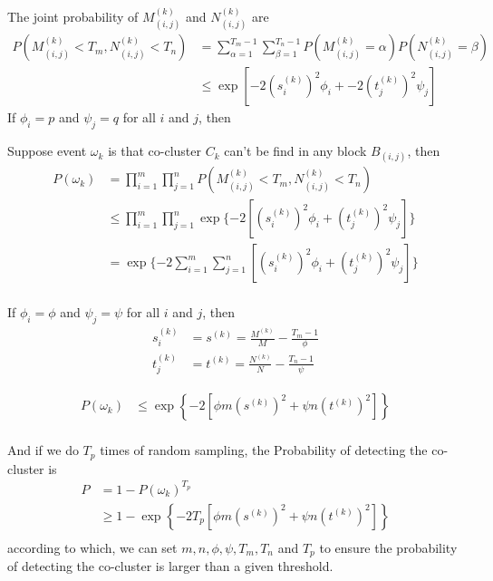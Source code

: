 The joint probability of $M_{(i,j)}^{(k)}$ and $N_{(i,j)}^{(k)}$ are
\begin{align*}
    P(M_{(i,j)}^{(k)} < T_m, N_{(i,j)}^{(k)} < T_n) & = \sum_{\alpha=1}^{T_m-1} \sum_{\beta=1}^{T_n-1} P(M_{(i,j)}^{(k)} = \alpha) P(N_{(i,j)}^{(k)} = \beta) \\
                                                    & \le \exp[-2 (s_i^{(k)})^2 \phi_i + -2 (t_j^{(k)})^2 \psi_j]
\end{align*}
If $\phi_i = p$ and $\psi_j = q$ for all $i$ and $j$, then

Suppose event $\omega_k$ is that co-cluster $C_k$ can't be find in any block $B_{(i,j)}$, then
\begin{align*}
    P(\omega_k) & = \prod_{i=1}^m \prod_{j=1}^n P(M_{(i,j)}^{(k)} < T_m, N_{(i,j)}^{(k)} < T_n)                          \\
                & \le \prod_{i=1}^m \prod_{j=1}^n \exp\{-2 \left[ (s_i^{(k)})^2 \phi_i + (t_j^{(k)})^2 \psi_j \right] \} \\
                & = \exp\{-2 \sum_{i=1}^m \sum_{j=1}^n \left[ (s_i^{(k)})^2 \phi_i + (t_j^{(k)})^2 \psi_j \right] \}     \\
\end{align*}

If $\phi_i = \phi$ and $\psi_j = \psi$ for all $i$ and $j$, then
\begin{align*}
    s_i^{(k)} & = s^{(k)} = \frac{M^{(k)}}{M}-\frac{T_m-1}{\phi} \\
    t_j^{(k)} & = t^{(k)} = \frac{N^{(k)}}{N}-\frac{T_n-1}{\psi}
\end{align*}

\begin{align*}
    P(\omega_k) & \le \exp \left\{ -2 [\phi m (s^{(k)})^2 + \psi n (t^{(k)})^2] \right\} \\
\end{align*}


And if we do $T_p$ times of random sampling, the Probability of detecting the co-cluster is
\begin{align*}
    P & = 1 - P(\omega_k)^{T_p}                                                        \\
      & \ge 1 - \exp \left\{ -2 T_p [\phi m (s^{(k)})^2 + \psi n (t^{(k)})^2] \right\} \\
\end{align*}
according to which, we can set $m, n, \phi, \psi, T_m, T_n$ and $T_p$ to ensure the probability of detecting the co-cluster is larger than a given threshold.

